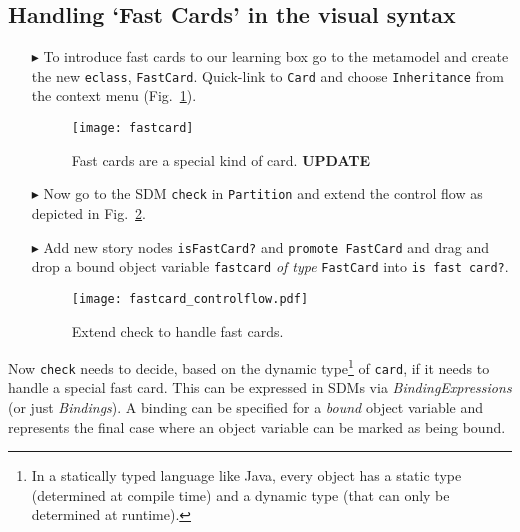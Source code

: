 \newpage
\subsection{Handling `Fast Cards' in the visual syntax}
\visHeader
\hypertarget{fastCard vis}{}

\begin{itemize}

\item[$\blacktriangleright$] To introduce fast cards to our learning box go to the metamodel and create the new \texttt{eclass}, \texttt{FastCard}. Quick-link
to \texttt{Card} and choose \texttt{Inheritance} from the context menu (Fig.~\ref{fig:sdm_fastcard_1}).

\begin{figure}[htp]
\begin{center}
  \texttt{[image: fastcard]}
  \caption{Fast cards are a special kind of card. {\bf UPDATE}}  
  \label{fig:sdm_fastcard_1}
\end{center}
\end{figure}

\item[$\blacktriangleright$] Now go to the SDM \texttt{check} in \texttt{Partition} and extend the control flow as depicted in Fig.~\ref{fig:sdm_fastcard_2}.
 
\item[$\blacktriangleright$] Add new story nodes \texttt{isFastCard?} and \texttt{promote FastCard} and drag and drop a bound object variable
\texttt{fastcard} \emph{of type} \texttt{FastCard} into \texttt{is fast card?}.

\begin{figure}[htbp]
\begin{center}
  \texttt{[image: fastcard\_controlflow.pdf]}
  \caption{Extend check to handle fast cards.}  
  \label{fig:sdm_fastcard_2}
\end{center}
\end{figure}

\end{itemize}

Now \texttt{check} needs to decide, based on the dynamic type\footnote{In a statically typed language like Java, every object has a static type (determined at
compile time) and a dynamic type (that can only be determined at runtime).} of \texttt{card}, if it needs to handle a special fast card. This can be expressed
in SDMs via \emph{BindingExpressions} (or just \emph{Bindings}). A binding can be specified for a \emph{bound} object variable  and represents
the final case where an object variable can be marked as being bound.


